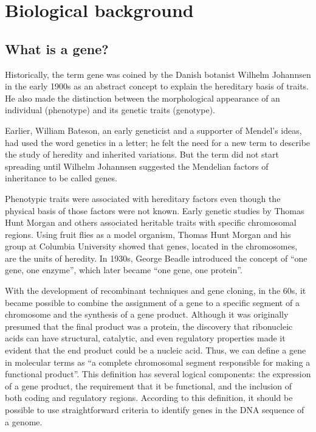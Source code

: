 \section{Biological background}

\subsection{What is a gene?} 

Historically, the term gene was coined by the Danish botanist Wilhelm
Johannsen in the early 1900s as an abstract concept to explain the
hereditary basis of traits. He also made the distinction between the
morphological appearance of an individual (phenotype) and its genetic
traits (genotype).

Earlier, William Bateson, an early geneticist and a supporter of
Mendel's ideas, had used the word genetics in a letter; he felt the
need for a new term to describe the study of heredity and inherited
variations. But the term did not start spreading until Wilhelm
Johannsen suggested the Mendelian factors of inheritance to be called
genes.

Phenotypic traits were associated with hereditary factors even though the
physical basis of those factors were not known. Early genetic studies
by Thomas Hunt Morgan and others associated heritable traits with
specific chromosomal regions. Using fruit flies as a model organism,
Thomas Hunt Morgan and his group at Columbia University showed that
genes, located in the chromosomes, are the units of heredity.  In 1930s,
George Beadle introduced the concept of ``one gene, one enzyme'',
which later became ``one gene, one protein''.

With the development of recombinant techniques and gene cloning, in
the 60s, it became possible to combine the assignment of a gene to a
specific segment of a chromosome and the synthesis of a gene product.
Although it was originally presumed that the final product was a
protein, the discovery that ribonucleic acids can have structural,
catalytic, and even regulatory properties made it evident that the end
product could be a nucleic acid. Thus, we can define a gene in
molecular terms as ``a complete chromosomal segment responsible for
making a functional product''. This definition has several logical
components: the expression of a gene product, the requirement that it
be functional, and the inclusion of both coding and regulatory
regions. According to this definition, it should be possible to use
straightforward criteria to identify genes in the DNA sequence of a
genome.

